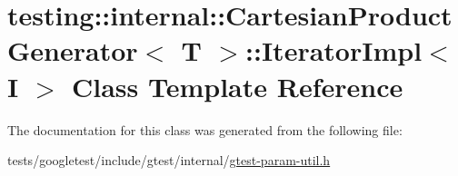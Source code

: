 \hypertarget{classtesting_1_1internal_1_1CartesianProductGenerator_1_1IteratorImpl}{}\section{testing\+:\+:internal\+:\+:Cartesian\+Product\+Generator$<$ T $>$\+:\+:Iterator\+Impl$<$ I $>$ Class Template Reference}
\label{classtesting_1_1internal_1_1CartesianProductGenerator_1_1IteratorImpl}


The documentation for this class was generated from the following file\+:\begin{DoxyCompactItemize}
\item 
tests/googletest/include/gtest/internal/\hyperlink{gtest-param-util_8h}{gtest-\/param-\/util.\+h}\end{DoxyCompactItemize}
